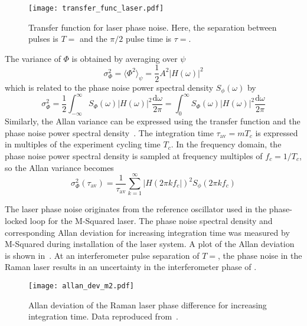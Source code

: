 \begin{figure}[htpb!]
  \centering
  \texttt{[image: transfer\_func\_laser.pdf]}
  \caption[Transfer function for laser phase noise.]{Transfer function
  for laser phase noise. Here, the separation between pulses is \(T =
  \) and the \(\pi/2\) pulse time is \(\tau
=\).}
  \label{fig:transfer_function}
\end{figure}
\par\noindent
The variance of \(\Phi\) is obtained by averaging over \(\psi\)
\begin{equation} 
  \sigma_\Phi^2 = \langle \Phi^2\rangle_\psi = \frac{1}{2} A^2
  |H(\omega)|^2
  \label{eq:var_phi_transfer}
\end{equation} which is related to the phase noise power spectral density
\(S_\phi(\omega)\) by
  \begin{equation}
    \sigma_\Phi^2 = \frac{1}{2}\int_{-\infty}^\infty
    S_\Phi(\omega)|H(\omega)|^2 \frac{\mathrm{d}\omega}{2\pi} =
      \int_0^\infty
    S_\Phi(\omega)|H(\omega)|^2 \frac{\mathrm{d}\omega}{2\pi} 
    \label{eq:phase_noise_psd}
  \end{equation}
Similarly, the Allan variance can be expressed using the transfer
function and the phase noise power spectral density~\cite{Gouet2008}.
The integration time \(\tau_\text{av} = m T_c\) is expressed in multiples
of the experiment cycling time \(T_c\). In the frequency domain, the phase
noise power spectral density is sampled at frequency multiples of
\(f_c = 1/T_c\), so the Allan variance becomes
\begin{equation}
  \sigma^2_\Phi(\tau_\text{av}) = \frac{1}{\tau_\text{av}}
    \sum_{k=1}^\infty |H(2\pi k f_c|)^2S_\phi(2\pi k f_c)
  \label{eq:avar_transfer}
\end{equation}
\par\noindent
The laser phase noise originates from the reference oscillator used in
the phase-locked loop for the M-Squared laser. The phase noise
spectral density and corresponding Allan deviation for increasing
integration time was measured by M-Squared during installation of the
laser system. A plot of the Allan deviation is shown
in~. At an interferometer pulse
separation of
\(T = \), the phase noise in the Raman
laser results in an uncertainty in the interferometer phase of
. 
\begin{figure}[htpb!]
  \centering
  \texttt{[image: allan\_dev\_m2.pdf]}
  \caption[Allan deviation of the Raman laser phase difference.]{Allan deviation of the Raman laser phase difference for increasing integration time. Data reproduced from~\cite{M2_manual}.}
  \label{fig:allan_dev_m2}
\end{figure}


